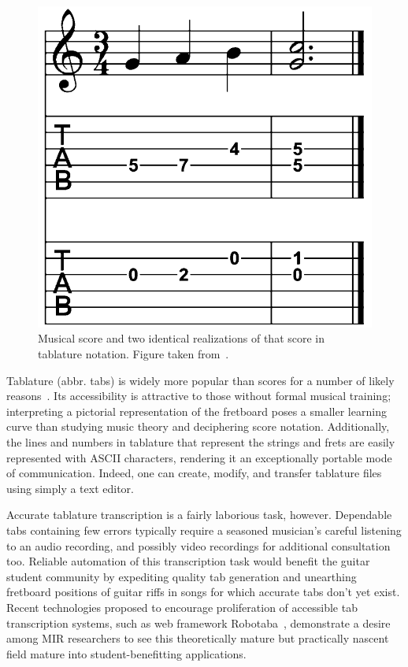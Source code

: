 \documentclass[12pt]{cmuthesis}
\begin{document}
\begin{figure}[!htbp] 
\centering
\includegraphics[scale=0.25]{score-tabs}
\caption{Musical score and two identical realizations of that score in tablature notation. Figure taken from~\cite{barbanchoi2012}.}
\label{fig:score-tabs}
\end{figure}

Tablature (abbr. tabs) is widely more popular than scores for a number of likely reasons~\cite{macrae2010}. Its accessibility is attractive to those without formal musical training; interpreting a pictorial representation of the fretboard poses a smaller learning curve than studying music theory and deciphering score notation. Additionally, the lines and numbers in tablature that represent the strings and frets are easily represented with ASCII characters, rendering it an exceptionally portable mode of communication. Indeed, one can create, modify, and transfer tablature files using simply a text editor.

Accurate tablature transcription is a fairly laborious task, however. Dependable tabs containing few errors typically require a seasoned musician's careful listening to an audio recording, and possibly video recordings for additional consultation too. Reliable automation of this transcription task would benefit the guitar student community by expediting quality tab generation and unearthing fretboard positions of guitar riffs in songs for which accurate tabs don't yet exist. Recent technologies proposed to encourage proliferation of accessible tab transcription systems, such as web framework Robotaba~\cite{burlet2013}, demonstrate a desire among MIR researchers to see this theoretically mature but practically nascent field mature into student-benefitting applications. 
\end{document}
